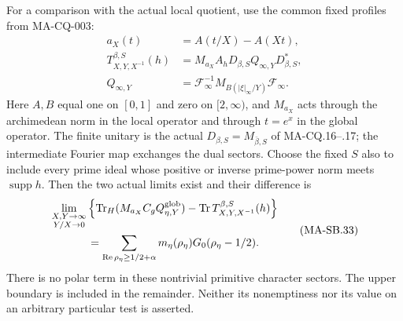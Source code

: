 For a comparison with the actual local quotient, use the
common fixed profiles from MA-CQ-003:
\[
 \begin{aligned}
 a_X(t)&=A(t/X)-A(Xt),\\
 T^{\beta,S}_{X,Y,X^{-1}}(h)
  &=M_{a_X}A_hD_{\beta,S}Q_{\infty,Y}D_{\beta,S}^*,\\
 Q_{\infty,Y}
  &=\mathcal F_\infty^{-1}
       M_{B(|\xi|_\infty/Y)}\mathcal F_\infty.
\end{aligned}
 \tag{MA-SB.32}
\]
Here $A,B$ equal one on $[0,1]$ and zero on $[2,\infty)$,
and $M_{a_X}$ acts through the archimedean norm in the
local operator and through $t=e^x$ in the global operator.
The finite unitary is the actual
$D_{\beta,S}=M_{\bar\beta,S}$ of MA-CQ.16--.17;
the intermediate Fourier map exchanges the dual sectors.
Choose the fixed $S$ also to include every prime ideal
whose positive or inverse prime-power norm meets
$\operatorname{supp}h$.
Then the two actual limits exist and their difference is
\[
 \begin{split}
 &\lim_{\substack{X,Y\to\infty\\Y/X\to0}}
 \left\{\operatorname{Tr}_H(M_{a_X}C_gQ_{\eta,Y}^{\rm glob})
            -\operatorname{Tr}T^{\beta,S}_{X,Y,X^{-1}}(h)\right\}\\
 &\hspace{12mm}=
    \sum_{\operatorname{Re}\rho_\eta\ge1/2+\alpha}
                  m_\eta(\rho_\eta)G_0(\rho_\eta-1/2).
\end{split}
 \tag{MA-SB.33}
\]
There is no polar term in these nontrivial primitive
character sectors.  The upper boundary is included in
the remainder.  Neither its nonemptiness nor its value
on an arbitrary particular test is asserted.

